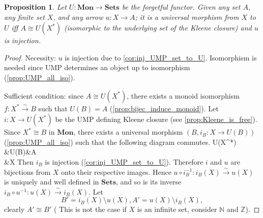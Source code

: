 \documentclass[12pt, letterpaper]{article}
\newcommand{\nat}{\mathbb{N}}
\newcommand{\inte}{\mathbb{Z}}
\newcommand{\red}[1]{{\color{red} #1}}
\newcommand{\symdif}{\triangle}
\newenvironment{centikzcd}{\center\tikzcd}{\endtikzcd\endcenter}
\newtheorem{prop}{Proposition}[section]
\theoremstyle{definition}
\theoremstyle{remark}
\theoremstyle{definition}
\theoremstyle{plain}
\newcommand{\epimono}{{\rightarrowtail\!\!\!\!\!\twoheadrightarrow}}
\newcommand{\iso}{{\xrightarrow{\sim}}}
\numberwithin{equation}{section}
\begin{document}
	\begin{prop}\label{prop:free_monoid_condition}
		Let $U\colon \mathbf{Mon}\to\mathbf{Sets}$ be the forgetful functor.
		Given any set $A$, any \red{finite} set $X$, and any arrow
		$u\colon X\to A$; it is a universal morphism from $X$ to $U$ iff
		$A\cong U(X^*)$ (isomorphic to the underlying set of the Kleene closure) and $u$ is injection.
	\end{prop}
	\begin{proof}
		Necessity: $u$ is injection due to \ref{cor:inj_UMP_set_to_U}.
		Isomorphism is needed since UMP determines an object up to isomorphism
		(\ref{prop:UMP_all_iso}).
		
		Sufficient condition:
		since $A\cong U(X^*)$, there exists a monoid isomorphism 
		$f\colon X^* \iso B$ such that $U(B)=A$
		(\ref{prop:bijec_induce_monoid}).
		Let $i\colon X\to U(X^*)$ be the UMP defining Kleene closure (see \ref{prop:Kleene_is_free}).
		Since $X^*\cong B$ in $\mathbf{Mon}$, there exists a universal morphism $(B, i_B\colon X\to U(B))$ (\ref{prop:UMP_all_iso})
		such that the following diagram commutes.
		\begin{centikzcd}
			U(X^*)%
			\ar[r,
			"U(f)"]&U(B)\ar[r,dashed,"h"]&A\\
			&X\ar[lu,"i"]\ar[u,tail,"i_B"]\ar[ru,tail,"u"']
		\end{centikzcd}
		Then $i_B$ is injection (\ref{cor:inj_UMP_set_to_U}).
		Therefore $i$ and $u$ are bijections from $X$ onto their respective images.
		Hence $u\circ i_B^{-1}\colon i_B(X)\iso u(X)$ is uniquely and well defined  in $\mathbf{Sets}$,
		and so is its inverse $i_B\circ u^{-1}\colon u(X)\iso i_B(X)$.
		Let \[B'=i_B(X)\setminus u(X), A'=u(X)\setminus i_B(X),\]
		clearly $A'\cong B'$ (\red{This is not the case if $X$ is an infinite set, consider $\nat$ and $\inte$}).

\end{proof}
\end{document}
